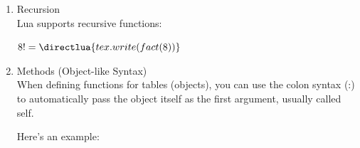 \begin{enumerate}[label=(\alph*)]
\begin{itemize}
\begin{tkzexample}[latex=.2\textwidth]
{    tex.print(sum_all(1, 2, 3, 4))
    }
  \end{tkzexample}


\item   Second example:

Here, I'm using a new function from the  package, which replaces an old Lua function , which was used to obtain the size of the table.

  \begin{tkzexample}[latex=.2\textwidth]
  \end{tkzexample}


\item   Third example:

It's always possible to use \#, with a little effort (texhnic).

\begin{tkzexample}[latex=.2\textwidth]
 \bgroup
 \catcode`\#=12
 \egroup
\end{tkzexample}
\end{itemize}


\item  Recursion\\

Lua supports recursive functions:

\begin{tkzexample}[latex=.4\textwidth]
  \newcommand*{\luafact}[1]{\directlua{
    tex.write(fact(\the\numexpr(#1)\relax))}%
  }
  $8! = \luafact{8}$
\end{tkzexample}



\item Methods (Object-like Syntax)\\

When defining functions for tables (objects), you can use the colon syntax (:) to automatically pass the object itself as the first argument, usually called self.

Here's an example:



\end{enumerate}
